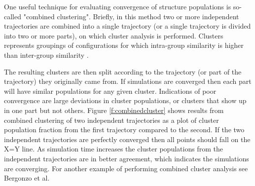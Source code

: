 One useful technique for evaluating convergence of structure populations is so-called "combined clustering". Briefly, in this method two or more independent trajectories are combined into a single trajectory (or a single trajectory is divided into two or more parts), on which cluster analysis is performed. Clusters represents groupings of configurations for which intra-group similarity is higher than inter-group similarity \citep{Okur2006}.

The resulting clusters are then split according to the trajectory (or part of the trajectory) they originally came from. If simulations are converged then each part will have similar populations for any given cluster. Indications of poor convergence are large deviations in cluster populations, or clusters that show up in one part but not others. Figure \ref{f:combinedcluster} shows results from combined clustering of two independent trajectories as a plot of cluster population fraction from the first trajectory compared to the second. If the two independent trajectories are perfectly converged then all points should fall on the X=Y line. As simulation time increases the cluster populations from the independent trajectories are in better agreement, which indicates the simulations are converging. For another example of performing combined cluster analysis see Bergonzo et al.\citep{Bergonzo2014}
